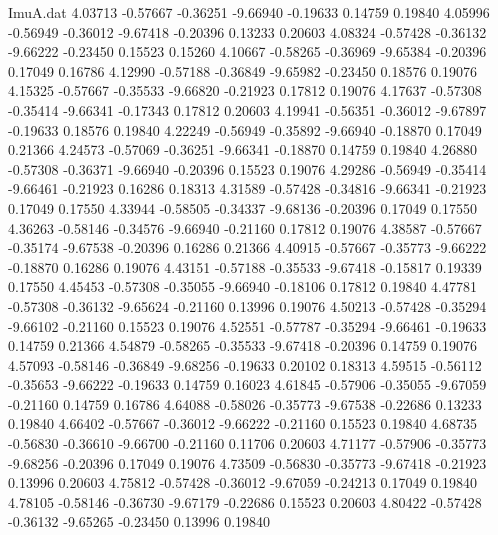 \begin{filecontents}{ImuA.dat}
   4.03713   -0.57667   -0.36251   -9.66940   -0.19633    0.14759    0.19840
   4.05996   -0.56949   -0.36012   -9.67418   -0.20396    0.13233    0.20603
   4.08324   -0.57428   -0.36132   -9.66222   -0.23450    0.15523    0.15260
   4.10667   -0.58265   -0.36969   -9.65384   -0.20396    0.17049    0.16786
   4.12990   -0.57188   -0.36849   -9.65982   -0.23450    0.18576    0.19076
   4.15325   -0.57667   -0.35533   -9.66820   -0.21923    0.17812    0.19076
   4.17637   -0.57308   -0.35414   -9.66341   -0.17343    0.17812    0.20603
   4.19941   -0.56351   -0.36012   -9.67897   -0.19633    0.18576    0.19840
   4.22249   -0.56949   -0.35892   -9.66940   -0.18870    0.17049    0.21366
   4.24573   -0.57069   -0.36251   -9.66341   -0.18870    0.14759    0.19840
   4.26880   -0.57308   -0.36371   -9.66940   -0.20396    0.15523    0.19076
   4.29286   -0.56949   -0.35414   -9.66461   -0.21923    0.16286    0.18313
   4.31589   -0.57428   -0.34816   -9.66341   -0.21923    0.17049    0.17550
   4.33944   -0.58505   -0.34337   -9.68136   -0.20396    0.17049    0.17550
   4.36263   -0.58146   -0.34576   -9.66940   -0.21160    0.17812    0.19076
   4.38587   -0.57667   -0.35174   -9.67538   -0.20396    0.16286    0.21366
   4.40915   -0.57667   -0.35773   -9.66222   -0.18870    0.16286    0.19076
   4.43151   -0.57188   -0.35533   -9.67418   -0.15817    0.19339    0.17550
   4.45453   -0.57308   -0.35055   -9.66940   -0.18106    0.17812    0.19840
   4.47781   -0.57308   -0.36132   -9.65624   -0.21160    0.13996    0.19076
   4.50213   -0.57428   -0.35294   -9.66102   -0.21160    0.15523    0.19076
   4.52551   -0.57787   -0.35294   -9.66461   -0.19633    0.14759    0.21366
   4.54879   -0.58265   -0.35533   -9.67418   -0.20396    0.14759    0.19076
   4.57093   -0.58146   -0.36849   -9.68256   -0.19633    0.20102    0.18313
   4.59515   -0.56112   -0.35653   -9.66222   -0.19633    0.14759    0.16023
   4.61845   -0.57906   -0.35055   -9.67059   -0.21160    0.14759    0.16786
   4.64088   -0.58026   -0.35773   -9.67538   -0.22686    0.13233    0.19840
   4.66402   -0.57667   -0.36012   -9.66222   -0.21160    0.15523    0.19840
   4.68735   -0.56830   -0.36610   -9.66700   -0.21160    0.11706    0.20603
   4.71177   -0.57906   -0.35773   -9.68256   -0.20396    0.17049    0.19076
   4.73509   -0.56830   -0.35773   -9.67418   -0.21923    0.13996    0.20603
   4.75812   -0.57428   -0.36012   -9.67059   -0.24213    0.17049    0.19840
   4.78105   -0.58146   -0.36730   -9.67179   -0.22686    0.15523    0.20603
   4.80422   -0.57428   -0.36132   -9.65265   -0.23450    0.13996    0.19840

\end{filecontents}
